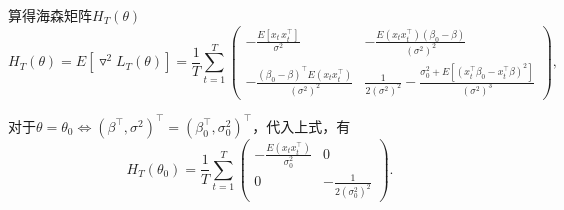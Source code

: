 \begin{itemize}
算得海森矩阵$H_{T} \left( \theta \right)$
\begin{equation}
    \label{eq:qmle-example-hessian}
    H_{T} \left( \theta \right) = E \left[ \triangledown^{2} L_{T} \left( \theta \right) \right]
    = \frac{1}{T} \sum_{t=1}^{T}
    \begin{pmatrix}
        - \frac{
        E \left[ x_{t} \, x_{t}^{\top} \right]
        }{
        \sigma^{2}
        } &
        - \frac{
        E \left(x_{t} x_{t}^{\top} \right) \left( \beta_{0} - \beta \right)
        }{
        \left( \sigma^{2} \right)^{2}
        } \\
        - \frac{
        \left( \beta_{0} - \beta \right)^{\top} E \left(x_{t} x_{t}^{\top} \right)
        }{
        \left( \sigma^{2} \right)^{2}
        } &
        \frac{
        1
        }{
        2 \left( \sigma^{2} \right)^{2}
        }
        - \frac{
        \sigma_{0}^{2} + E \left[
        \left( x_{t}^{\top} \beta_{0} - x_{t}^{\top} \beta \right)^{2}
        \right]
        }{
        \left( \sigma^{2} \right)^{3}
        }
    \end{pmatrix},
\end{equation}
\end{itemize}

对于$\theta = \theta_{0} \Longleftrightarrow \left( \beta^{\top} , \sigma^{2} \right)^{\top} = \left(\beta_{0}^{\top} ,\sigma_{0}^{2} \right)^{\top}$，代入上式，有
\begin{equation}
    \label{eq:qmle-example-hessian-theta0}
    H_{T} \left( \theta_{0} \right)
    = \frac{1}{T} \sum_{t=1}^{T}
    \begin{pmatrix}
        - \frac{E \left( x_{t} x_{t}^{\top} \right)}{\sigma_{0}^{2}}
        & 0 \\
        0 & - \frac{1}{2 \left( \sigma_{0}^{2} \right)^{2}}
    \end{pmatrix}.
\end{equation}

